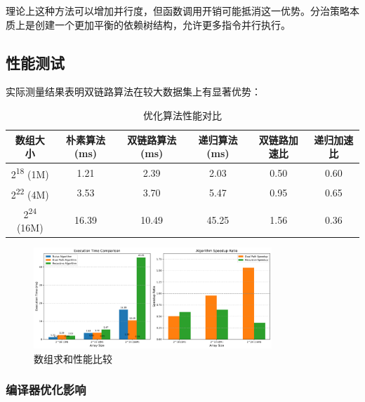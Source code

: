 \documentclass[a4paper,colorlinks=true,linkcolor=blue,urlcolor=blue,citecolor=green,bookmarks=true]{article}
\begin{document}
理论上这种方法可以增加并行度，但函数调用开销可能抵消这一优势。分治策略本质上是创建一个更加平衡的依赖树结构，允许更多指令并行执行。

\subsection{性能测试}

实际测量结果表明双链路算法在较大数据集上有显著优势：

\begin{table}[htbp]
\centering
\caption{优化算法性能对比}
\label{tab:opt_sum_perf}
\begin{tabular}{|c|c|c|c|c|c|}
\hline
\textbf{数组大小} & \textbf{朴素算法(ms)} & \textbf{双链路算法(ms)} & \textbf{递归算法(ms)} & \textbf{双链路加速比} & \textbf{递归加速比} \\
\hline
2\textsuperscript{18} (1M) & 1.21 & 2.39 & 2.03 & 0.50 & 0.60 \\
\hline
2\textsuperscript{22} (4M) & 3.53 & 3.70 & 5.47 & 0.95 & 0.65 \\
\hline
2\textsuperscript{24} (16M) & 16.39 & 10.49 & 45.25 & 1.56 & 0.36 \\
\hline
\end{tabular}
\end{table}

\begin{figure}[htbp]
  \centering
  \includegraphics[width=0.8\textwidth]{sum_array_performance.png}
  \caption{数组求和性能比较}
  \label{fig:sum_array_performance}
\end{figure}

\subsubsection{编译器优化影响}
\end{document}
